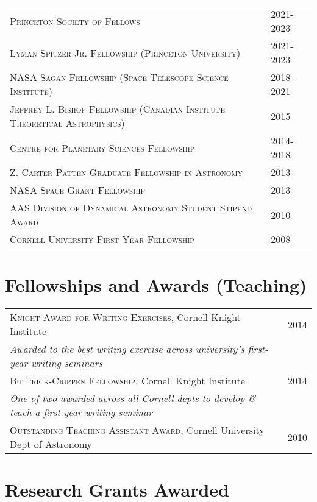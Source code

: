 \documentclass[10pt]{article} %
\begin{document}
\begin{tabular}{l>{\hfill}p{1.7cm}}
\textsc{Princeton Society of Fellows} & 2021-2023 \\
\textsc{Lyman Spitzer Jr. Fellowship (Princeton University)} & 2021-2023 \\
\textsc{NASA Sagan Fellowship (Space Telescope Science Institute)} & 2018-2021\\
\textsc{Jeffrey L. Bishop Fellowship (Canadian Institute Theoretical Astrophysics)} & 2015 \\
\textsc{Centre for Planetary Sciences Fellowship} & 2014-2018 \\
\textsc{Z. Carter Patten Graduate Fellowship in Astronomy} & 2013 \\
\textsc{NASA Space Grant Fellowship} & 2013 \\
\textsc{AAS Division of Dynamical Astronomy Student Stipend Award} & 2010\\
\textsc{Cornell University First Year Fellowship} & 2008 \\
\end{tabular}

\section{Fellowships and Awards (Teaching)}

\begin{tabular}{l>{\hfill}p{1.65cm}}
\textsc{Knight Award for Writing Exercises}, Cornell Knight Institute & 2014 \\
{\it Awarded to the best writing exercise across university's first-year writing seminars} \\
\textsc{Buttrick-Crippen Fellowship}, Cornell Knight Institute & 2014 \\
{\it One of two awarded across all Cornell depts to develop \& teach a first-year writing seminar} \\
\textsc{Outstanding Teaching Assistant Award}, Cornell University Dept of Astronomy & 2010 \\
\end{tabular}



\section{Research Grants Awarded}
\end{document}
